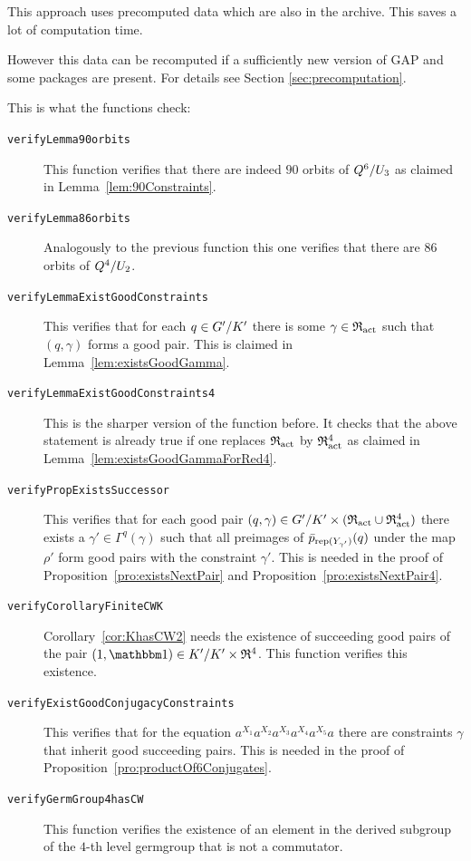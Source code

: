 \documentclass[a4paper,11pt]{amsart}
\begin{document}
This approach uses precomputed data which are also in the archive. This saves a lot of
computation time.

However this data can be recomputed if a sufficiently new version of GAP and
some packages are present. For details see Section \ref{sec:precomputation}.

This is what the functions check:
\begin{description}
\item[\texttt{verifyLemma90orbits}] This function verifies that there are
  indeed $90$ orbits of ${Q^6/U_3}$ as claimed in 
  Lemma~\ref{lem:90Constraints}. 
\item[\texttt{verifyLemma86orbits}] Analogously to the previous function 
  this one verifies that there are $86$ orbits of ${Q^4/U_2}$. 
\item[\texttt{verifyLemmaExistGoodConstraints}] This verifies that for each 
  $q\in{G'/K'}$ there is some $\gamma\in\mathfrak{R}_{\operatorname{act}}$ such that $(q,\gamma)$ 
  forms a good pair. This is claimed in Lemma~\ref{lem:existsGoodGamma}.
\item[\texttt{verifyLemmaExistGoodConstraints4}] This is the sharper version
  of the function before. It checks that the above statement is already true 
  if one replaces $\mathfrak{R}_{\operatorname{act}}$ by $\mathfrak{R}_{\operatorname{act}}^4$ as claimed in 
  Lemma~\ref{lem:existsGoodGammaForRed4}.
\item[\texttt{verifyPropExistsSuccessor}] This verifies that for
  each good pair $(q,\gamma) \in{G'/K'}\times(\mathfrak{R}_{\operatorname{act}}\cup \mathfrak{R}_{\operatorname{act}}^4)$ there exists 
  a $\gamma'\in\Gamma^q(\gamma)$ such that all preimages of 
  $\bar p_{\operatorname{rep}(Y_{\gamma'})}(q)$ under the map $\rho'$ form
  good pairs with the constraint $\gamma'$. This is needed in the proof of
  Proposition~\ref{pro:existsNextPair} and Proposition~\ref{pro:existsNextPair4}.
\item[\texttt{verifyCorollaryFiniteCWK}] Corollary~\ref{cor:KhasCW2} needs the
  existence of succeeding good pairs of the pair $(1,\id)\in\RNK{K'}{K'}\times\Red^4$.
  This function verifies this existence. 
\item[\texttt{verifyExistGoodConjugacyConstraints}] This verifies that for the equation
  $a^{X_1}a^{X_2}a^{X_3}a^{X_4}a^{X_5}a$ there are constraints $\gamma$ 
  that inherit good succeeding pairs. This is needed in the proof of
  Proposition~\ref{pro:productOf6Conjugates}.
\item[\texttt{verifyGermGroup4hasCW}] This function verifies the existence of 
  an element in the derived subgroup of the $4$-th level germgroup that is not a commutator.
\end{description}
\end{document}
